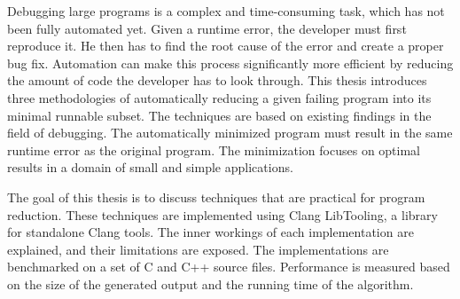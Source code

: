 \documentclass[12pt]{report}
\begin{document}

Debugging large programs is a complex and time-consuming task, which has not 
been fully automated yet. 
Given a runtime error, the developer must first reproduce it. 
He then has to find the root cause of the error and create a proper bug fix. 
Automation can make this process significantly more efficient by reducing 
the amount of code the developer has to look through. 
This thesis introduces three methodologies of automatically reducing a given 
failing program into its minimal runnable subset. 
The techniques are based on existing findings in the field of debugging. 
The automatically minimized program must result in the same runtime error 
as the original program. 
The minimization focuses on optimal results in a domain of small and simple 
applications. 

The goal of this thesis is to discuss techniques that are practical for 
program reduction. 
These techniques are implemented using Clang LibTooling, a library for 
standalone Clang tools. 
The inner workings of each implementation are explained, and their limitations 
are exposed. 
The implementations are benchmarked on a set of C and C++ source files.  
Performance is measured based on the size of the generated output and 
the running time of the algorithm.
\end{document}
